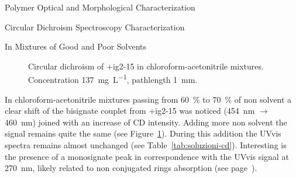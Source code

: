 \begin{section}{Polymer Optical and Morphological Characterization}
\begin{subsection}{Circular Dichroism Spectroscopy Characterization}
\begin{subsubsection}{In Mixtures of Good and Poor Solvents}
\begin{figure}[tbp]%
 \caption[Circular dichroism of \cmpd+{ig2-15} in chloro\-form-aceto\-nitrile mixtures.]{Circular dichroism of \cmpd+{ig2-15} in chloro\-form-aceto\-nitrile mixtures. Concentration \SI{137}{\mg\per\liter}, pathlength \SI{1}{\mm}.}
\label{fig:ig2-15-cd-ch3cn}
\end{figure}

In chloro\-form-aceto\-nitrile mixtures passing from 60~\% to 70~\% of non solvent a clear shift of the bisignate couplet from \cmpd+{ig2-15} was noticed (\SI{454}{\nm} $\rightarrow$ \SI{460}{\nm}) joined with an increase of \gls{CD} intensity. Adding more non solvent the signal remains quite the same (see Figure~\ref{fig:ig2-15-cd-ch3cn}). During this addition the \gls{UVvis} spectra remains almost unchanged (see Table~\ref{tab:soluzioni-cd}). Interesting is the presence of a monosignate peak in correspondence with the \gls{UVvis} signal at \SI{270}{\nm}, likely related to non conjugated rings absorption (see page~\pageref{peak-265}).


\end{subsubsection}
\end{subsection}
\end{section}
